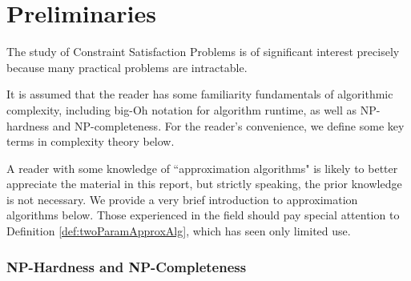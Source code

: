 %
%
%
%

%
%
%
%
%
%
%
%
%

\section*{Preliminaries}

The study of Constraint Satisfaction Problems is of significant interest precisely because many practical problems are intractable.  

It is assumed that the reader has some familiarity fundamentals of algorithmic complexity, including big-Oh notation for algorithm runtime, as well as NP-hardness and NP-completeness. 
For the reader's convenience, we define some key terms in complexity theory below.

A reader with some knowledge of ``approximation algorithms" is likely to better appreciate the material in this report, but strictly speaking, the prior knowledge is not necessary. 
We provide a very brief introduction to approximation algorithms below. 
Those experienced in the field should pay special attention to Definition \ref{def:twoParamApproxAlg}, which has seen only limited use.

\subsubsection*{NP-Hardness and NP-Completeness}

